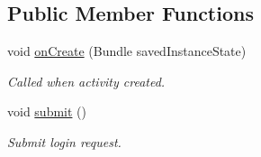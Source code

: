\subsection*{Public Member Functions}
\begin{DoxyCompactItemize}
\item 
void \hyperlink{classuk_1_1ac_1_1swan_1_1digitaltrails_1_1accounts_1_1_authenticator_activity_a552d0ee1b418814c3a97cf21ca1c038c}{on\+Create} (Bundle saved\+Instance\+State)
\begin{DoxyCompactList}\small\item\em Called when activity created. \end{DoxyCompactList}\item 
void \hyperlink{classuk_1_1ac_1_1swan_1_1digitaltrails_1_1accounts_1_1_authenticator_activity_a771eb6c281eece044fa2884364472850}{submit} ()
\begin{DoxyCompactList}\small\item\em Submit login request. \end{DoxyCompactList}\end{DoxyCompactItemize}
